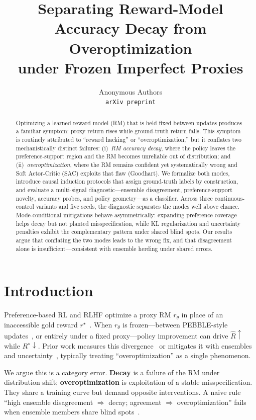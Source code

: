 \documentclass{article}
\title{Separating Reward-Model Accuracy Decay from Overoptimization\\
\large under Frozen Imperfect Proxies}
\author{
  Anonymous Authors\\
  \texttt{arXiv preprint}
}
\date{}
\begin{document}
\maketitle

\begin{abstract}
Optimizing a learned reward model (RM) that is held fixed between updates produces a familiar symptom: proxy return rises while ground-truth return falls.
This symptom is routinely attributed to ``reward hacking'' or ``overoptimization,'' but it conflates two mechanistically distinct failures:
(i)~\emph{RM accuracy decay}, where the policy leaves the preference-support region and the RM becomes unreliable out of distribution; and
(ii)~\emph{overoptimization}, where the RM remains confident yet systematically wrong and Soft Actor-Critic (SAC) exploits that flaw (Goodhart).
We formalize both modes, introduce causal induction protocols that assign ground-truth labels by construction, and evaluate a multi-signal diagnostic---ensemble disagreement, preference-support novelty, accuracy probes, and policy geometry---as a classifier.
Across three continuous-control variants and five seeds, the diagnostic separates the modes well above chance.
Mode-conditional mitigations behave asymmetrically: expanding preference coverage helps decay but not planted misspecification, while KL regularization and uncertainty penalties exhibit the complementary pattern under shared blind spots.
Our results argue that conflating the two modes leads to the wrong fix, and that disagreement alone is insufficient---consistent with ensemble herding under shared errors.
\end{abstract}

\section{Introduction}
Preference-based RL and RLHF optimize a proxy RM $r_\theta$ in place of an inaccessible gold reward $r^\star$~\citep{lee2021pebble,gao2023scaling}.
When $r_\theta$ is frozen---between PEBBLE-style updates~\citep{lee2021pebble}, or entirely under a fixed proxy---policy improvement can drive $\hat R\uparrow$ while $R^\star\downarrow$.
Prior work measures this divergence~\citep{gao2023scaling} or mitigates it with ensembles and uncertainty~\citep{eisenstein2024helping,coste2023reward,advpo2024,urm2024,inform2024}, typically treating ``overoptimization'' as a single phenomenon.

We argue this is a category error.
\textbf{Decay} is a failure of the RM under distribution shift; \textbf{overoptimization} is exploitation of a stable misspecification.
They share a training curve but demand opposite interventions.
A naive rule ``high ensemble disagreement $\Rightarrow$ decay; agreement $\Rightarrow$ overoptimization'' fails when ensemble members share blind spots~\citep{eisenstein2024helping}.
\end{document}
